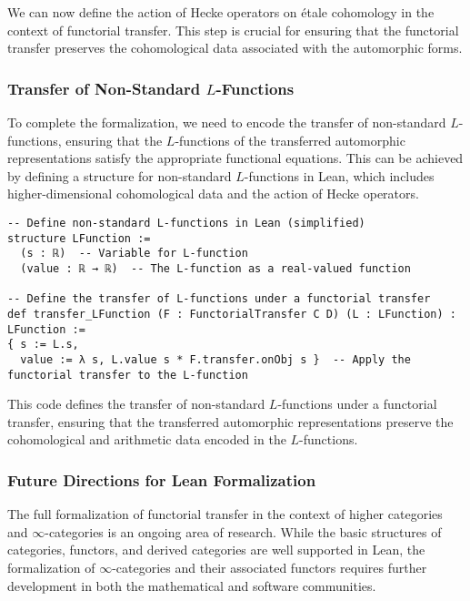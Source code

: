 \documentclass{article}
\theoremstyle{remark}
\begin{document}
We can now define the action of Hecke operators on étale cohomology in the context of functorial transfer. This step is crucial for ensuring that the functorial transfer preserves the cohomological data associated with the automorphic forms.

\subsubsection{Transfer of Non-Standard $L$-Functions}

To complete the formalization, we need to encode the transfer of non-standard $L$-functions, ensuring that the $L$-functions of the transferred automorphic representations satisfy the appropriate functional equations. This can be achieved by defining a structure for non-standard $L$-functions in Lean, which includes higher-dimensional cohomological data and the action of Hecke operators.

\begin{lstlisting}
-- Define non-standard L-functions in Lean (simplified)
structure LFunction :=
  (s : ℝ)  -- Variable for L-function
  (value : ℝ → ℝ)  -- The L-function as a real-valued function

-- Define the transfer of L-functions under a functorial transfer
def transfer_LFunction (F : FunctorialTransfer C D) (L : LFunction) : LFunction :=
{ s := L.s,
  value := λ s, L.value s * F.transfer.onObj s }  -- Apply the functorial transfer to the L-function
\end{lstlisting}

This code defines the transfer of non-standard $L$-functions under a functorial transfer, ensuring that the transferred automorphic representations preserve the cohomological and arithmetic data encoded in the $L$-functions.

\subsubsection{Future Directions for Lean Formalization}

The full formalization of functorial transfer in the context of higher categories and $\infty$-categories is an ongoing area of research. While the basic structures of categories, functors, and derived categories are well supported in Lean, the formalization of $\infty$-categories and their associated functors requires further development in both the mathematical and software communities.
\end{document}
